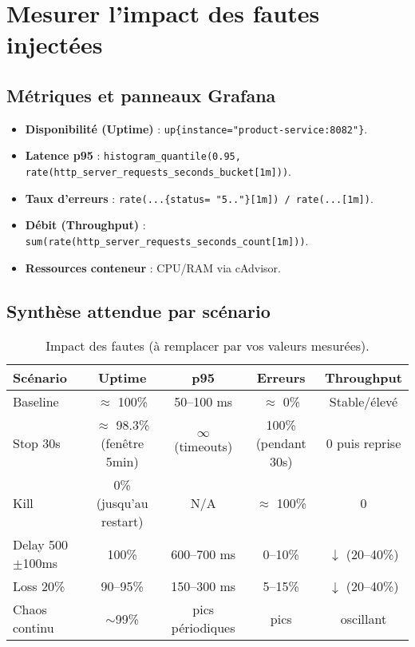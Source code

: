 \chapter{Mesurer l'impact des fautes injectées}
\label{chap:mesures}

\section{Métriques et panneaux Grafana}
\begin{itemize}
  \item \textbf{Disponibilité (Uptime)} : \texttt{up\{instance="product-service:8082"\}}.
  \item \textbf{Latence p95} : \texttt{histogram\_quantile(0.95, rate(http\_server\_requests\_seconds\_bucket[1m]))}.
  \item \textbf{Taux d'erreurs} : \texttt{rate(...\{status=~"5.."\}[1m]) / rate(...[1m])}.
  \item \textbf{Débit (Throughput)} : \texttt{sum(rate(http\_server\_requests\_seconds\_count[1m]))}.
  \item \textbf{Ressources conteneur} : CPU/RAM via cAdvisor.
\end{itemize}

\section{Synthèse attendue par scénario}
\begin{table}[H]
\centering
\begin{tabular}{lcccc}
\toprule
\textbf{Scénario} & \textbf{Uptime} & \textbf{p95} & \textbf{Erreurs} & \textbf{Throughput} \\
\midrule
Baseline & $\approx$ 100\% & 50--100 ms & $\approx$ 0\% & Stable/élevé \\
Stop 30s & $\approx$ 98.3\% (fenêtre 5min) & $\infty$ (timeouts) & 100\% (pendant 30s) & 0 puis reprise \\
Kill     & 0\% (jusqu'au restart) & N/A & $\approx$ 100\% & 0 \\
Delay 500$\pm$100ms & 100\% & 600--700 ms & 0--10\% & $\downarrow$ (20--40\%) \\
Loss 20\% & 90--95\% & 150--300 ms & 5--15\% & $\downarrow$ (20--40\%) \\
Chaos continu & $\sim$99\% & pics périodiques & pics & oscillant \\
\bottomrule
\end{tabular}
\caption{Impact des fautes (à remplacer par vos valeurs mesurées).}
\end{table}

